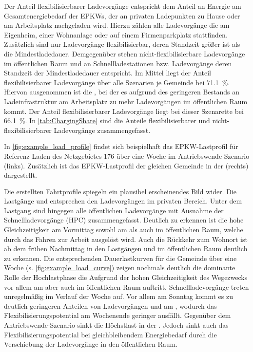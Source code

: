Der Anteil flexibilisierbarer Ladevorgänge entspricht dem Anteil an Energie am Gesamtenergiebedarf der \glspl{EPKW}, der an privaten Ladepunkten zu Hause oder am Arbeitsplatz nachgeladen wird.
Hierzu zählen alle Ladevorgänge die am Eigenheim, einer Wohnanlage oder auf einem Firmenparkplatz stattfinden.
Zusätzlich sind nur Ladevorgänge flexibilisierbar, deren Standzeit größer ist als die Mindestladedauer.
Demgegenüber stehen nicht-flexibilisierbare Ladevorgänge im öffentlichen Raum und an Schnellladestationen bzw. Ladevorgänge deren Standzeit der Mindestladedauer entspricht.
Im Mittel liegt der Anteil flexibilisierbarer Ladevorgänge über alle Szenarien je Gemeinde bei \SI{71.1}{\percent}.
Hiervon ausgenommen ist die \SzeFirmenparkplatzdot, bei der es aufgrund des geringeren Bestands an Ladeinfrastruktur am Arbeitsplatz zu mehr Ladevorgängen im öffentlichen Raum kommt.
Der Anteil flexibilisierbarer Ladevorgänge liegt bei dieser Szenarette bei \SI{66.1}{\percent}.
In \autoref{tab:ChargingShare} sind die Anteile flexibilisierbarer und nicht-flexibilisierbarer Ladevorgänge zusammengefasst.



In \autoref{fig:example_load_profile} findet sich beispielhaft das \gls{EPKW}-Lastprofil für Referenz-Laden des Netzgebietes \num{176} über eine Woche im Antriebswende-Szenario (links).
Zusätzlich ist das \gls{EPKW}-Lastprofil der gleichen Gemeinde in der \SzeFirmenparkplatz (rechts) dargestellt.


Die erstellten Fahrtprofile spiegeln ein plausibel erscheinendes Bild wider.
Die Lastgänge \zH und \Firmeparkplatz entsprechen den Ladevorgängen im privaten Bereich.
Unter dem Lastgang \oeffen sind hingegen alle öffentlichen Ladevorgänge mit Ausnahme der Schnellladevorgänge (\gls{HPC}) zusammengefasst.
Deutlich zu erkennen ist die hohe Gleichzeitigkeit am Vormittag sowohl am \Firmeparkplatz als auch im öffentlichen Raum, welche durch das Fahren zur Arbeit ausgelöst wird.
Auch die Rückkehr zum Wohnort ist ab dem frühen Nachmittag in den Lastgängen \zH und im öffentlichen Raum deutlich zu erkennen.
Die entsprechenden Dauerlastkurven für die Gemeinde über eine Woche (s. \autoref{fig:example_load_curve}) zeigen nochmals deutlich die dominante Rolle der Hochlastphase die Aufgrund der hohen Gleichzeitigkeit des Wegezwecks \Arbeit vor allem am \Firmeparkplatz aber auch im öffentlichen Raum auftritt.
Schnellladevorgänge treten unregelmäßig im Verlauf der Woche auf.
Vor allem am Sonntag kommt es zu deutlich geringeren Anteilen von Ladevorgängen \zH und am \Firmeparkplatzdot, wodurch das Flexibilisierungspotential am Wochenende geringer ausfällt.
Gegenüber dem Antriebswende-Szenario sinkt die Höchstlast in der \SzeFirmenparkplatzdot.
Jedoch sinkt auch das Flexibilisierungspotential bei gleichbleibendem Energiebedarf durch die Verschiebung der Ladevorgänge in den öffentlichen Raum.


